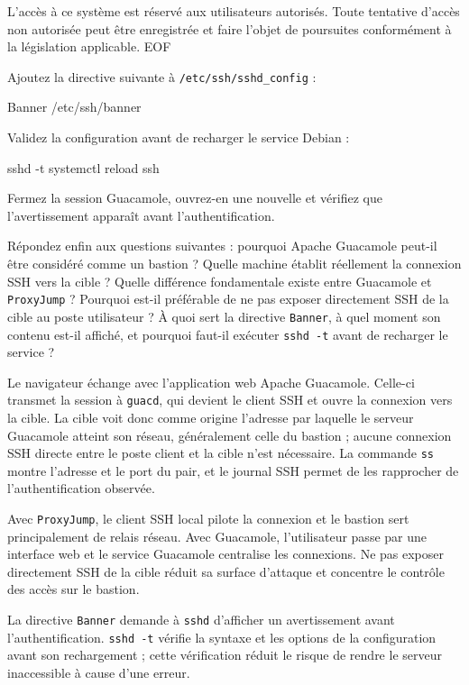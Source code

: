 \documentclass[a4paper,10pt]{exam}
\begin{document}
\begin{questions}
\begin{bashcode}
L'accès à ce système est réservé aux utilisateurs autorisés.
Toute tentative d'accès non autorisée peut être enregistrée et faire
l'objet de poursuites conformément à la législation applicable.
EOF
\end{bashcode}
Ajoutez la directive suivante à \texttt{/etc/ssh/sshd\_config} :
\begin{bashcode}
Banner /etc/ssh/banner
\end{bashcode}
Validez la configuration avant de recharger le service Debian :
\begin{bashcode}
sshd -t
systemctl reload ssh
\end{bashcode}
Fermez la session Guacamole, ouvrez-en une nouvelle et vérifiez que l'avertissement
apparaît avant l'authentification.

Répondez enfin aux questions suivantes : pourquoi Apache Guacamole peut-il être considéré
comme un bastion ? Quelle machine établit réellement la connexion SSH vers la cible ?
Quelle différence fondamentale existe entre Guacamole et \texttt{ProxyJump} ? Pourquoi
est-il préférable de ne pas exposer directement SSH de la cible au poste utilisateur ?
À quoi sert la directive \texttt{Banner}, à quel moment son contenu est-il affiché, et
pourquoi faut-il exécuter \texttt{sshd -t} avant de recharger le service ?
\begin{solution}
Le navigateur échange avec l'application web Apache Guacamole. Celle-ci transmet la
session à \texttt{guacd}, qui devient le client SSH et ouvre la connexion vers la cible.
La cible voit donc comme origine l'adresse par laquelle le serveur Guacamole atteint son
réseau, généralement celle du bastion ; aucune connexion SSH directe entre le poste client
et la cible n'est nécessaire. La commande \texttt{ss} montre l'adresse et le port du pair,
et le journal SSH permet de les rapprocher de l'authentification observée.

Avec \texttt{ProxyJump}, le client SSH local pilote la connexion et le bastion sert
principalement de relais réseau. Avec Guacamole, l'utilisateur passe par une interface web
et le service Guacamole centralise les connexions. Ne pas exposer directement SSH de la
cible réduit sa surface d'attaque et concentre le contrôle des accès sur le bastion.

La directive \texttt{Banner} demande à \texttt{sshd} d'afficher un avertissement avant
l'authentification. \texttt{sshd -t} vérifie la syntaxe et les options de la configuration
avant son rechargement ; cette vérification réduit le risque de rendre le serveur
inaccessible à cause d'une erreur.
\end{solution}
\end{questions}
\end{document}
